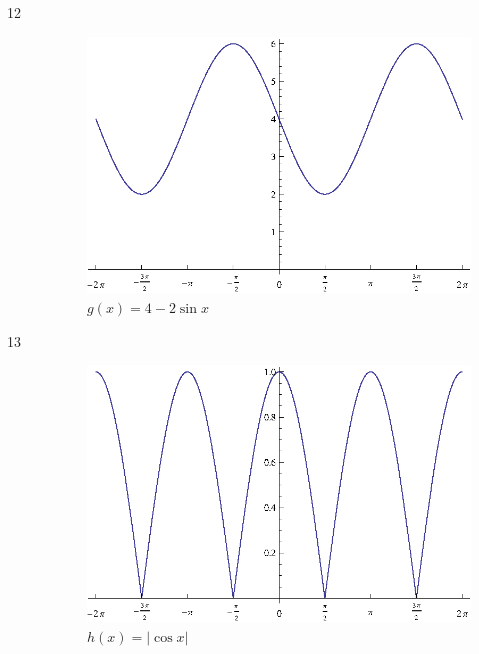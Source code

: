 \documentclass{exam}
\begin{document}
\begin{description}
      \item[12]
        \begin{figure}[H]
          \centering
          \includegraphics[scale=0.9]{exercise12.eps}
          \caption{$g(x) = 4 - 2 \sin x$}
        \end{figure}

      \item[13]
        \begin{figure}[H]
          \centering
          \includegraphics[scale=0.9]{exercise13.eps}
          \caption{$h(x) = | \cos x |$}
        \end{figure}


\end{description}
\end{document}
